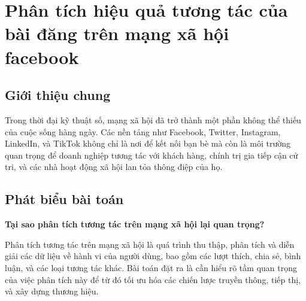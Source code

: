 \section{Phân tích hiệu quả tương tác của bài đăng trên mạng xã hội facebook}
\subsection{Giới thiệu chung}
Trong thời đại kỹ thuật số, mạng xã hội đã trở thành một phần không thể thiếu của cuộc sống hàng ngày. Các nền tảng như Facebook, Twitter, Instagram, LinkedIn, và TikTok không chỉ là nơi để kết nối bạn bè mà còn là môi trường quan trọng để doanh nghiệp tương tác với khách hàng, chính trị gia tiếp cận cử tri, và các nhà hoạt động xã hội lan tỏa thông điệp của họ.

\subsection{Phát biểu bài toán}
\textbf{Tại sao phân tích tương tác trên mạng xã hội lại quan trọng?}

Phân tích tương tác trên mạng xã hội là quá trình thu thập, phân tích và diễn giải các dữ liệu về hành vi của người dùng, bao gồm các lượt thích, chia sẻ, bình luận, và các loại tương tác khác. Bài toán đặt ra là cần hiểu rõ tầm quan trọng của việc phân tích này để từ đó tối ưu hóa các chiến lược truyền thông, tiếp thị, và xây dựng thương hiệu.

